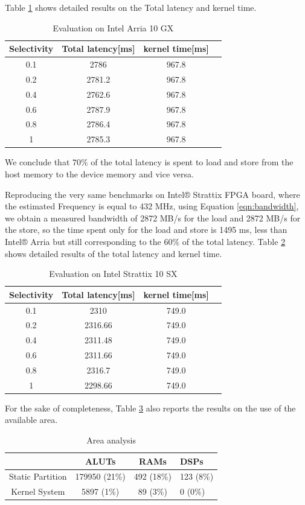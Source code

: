 \documentclass[sigconf, nonacm]{acmart}
\begin{document}
Table \ref{tab:select-arria} shows detailed results on the Total latency and kernel time.
\begin{table}[H]%
  \caption{Evaluation on Intel Arria 10 GX}
  \label{tab:select-arria}
  \begin{tabular}{cccl}
    \toprule
    Selectivity & Total latency[ms] & kernel time[ms]\\
    \midrule
    0.1 & 2786& 967.8\\
    0.2 & 2781.2 & 967.8\\
    0.4 & 2762.6 & 967.8\\
    0.6 & 2787.9 & 967.8\\
    0.8 & 2786.4 & 967.8\\
    1 & 2785.3 & 967.8\\
  \bottomrule
\end{tabular}
\end{table}
We conclude that $70\%$ of the total latency is spent to load and store from the host memory to the device memory and vice versa.

Reproducing the very same benchmarks on Intel® Strattix FPGA board, where the estimated Frequency is equal to 432 MHz, using Equation \ref{eqn:bandwidth}, we obtain a measured bandwidth of 2872 MB/s for the load and 2872 MB/s for the store, so the time spent only for the load and store is 1495 ms, less than Intel® Arria but still corresponding to the $60\%$ of the total latency.
Table \ref{tab:select-strattix} shows detailed results of the total latency and kernel time.
\begin{table}[H]%
  \caption{Evaluation on Intel Strattix 10 SX}
  \label{tab:select-strattix}
  \begin{tabular}{cccl}
    \toprule
    Selectivity & Total latency[ms] & kernel time[ms]\\
    \midrule
    0.1 & 2310& 749.0\\
    0.2 & 2316.66 & 749.0\\
    0.4 & 2311.48 & 749.0\\
    0.6 & 2311.66 & 749.0\\
    0.8 & 2316.7& 749.0\\
    1 & 2298.66 & 749.0\\
  \bottomrule
\end{tabular}
\end{table}
For the sake of completeness, Table \ref{tab:area-select} also reports the results on the use of the available area.
\begin{table}[H]%
  \caption{Area analysis}
  \label{tab:area-select}
  \begin{tabular}{cccl}
    \toprule
     & ALUTs & RAMs & DSPs\\
    \midrule
    Static Partition & 179950 (21\%) & 492 (18\%)  & 123 (8\%)\\
    Kernel System & 5897 (1\%)  & 89 (3\%)  & 0 (0\%)\\
  \bottomrule
\end{tabular}
\end{table}
\end{document}
